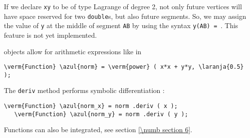 If we declare {\small\tt xy} to be of type Lagrange of degree 2, not only future vertices will
have space reserved for two {\small\tt double}s, but also future segments.
So, we may assign the value of {\small\tt y} at the middle of segment {\small\tt AB} by using
the syntax {\small\tt y(AB) = }.
This feature is not yet implemented.

{\small\tt{}} objects allow for arithmetic expressions like in

\begin{Verbatim}[commandchars=\\\{\},formatcom=\small\tt,
   baselinestretch=0.94,framesep=2mm                     ]
   \verm{Function} \azul{norm} = \verm{power} ( x*x + y*y, \laranja{0.5} );
\end{Verbatim}

The {\small\tt deriv} method performs symbolic differentiation :

\begin{Verbatim}[commandchars=\\\{\},formatcom=\small\tt,
   baselinestretch=0.94,framesep=2mm                     ]
   \verm{Function} \azul{norm_x} = norm .deriv ( x );
   \verm{Function} \azul{norm_y} = norm .deriv ( y );
\end{Verbatim}

Functions can also be integrated, see section \ref{\numb section 6}.


